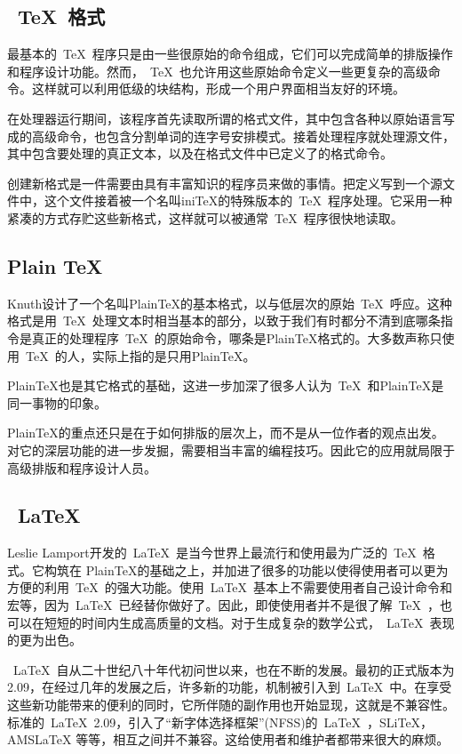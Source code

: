 \subsection{~\TeX{}~格式}
最基本的~\TeX{}~程序只是由一些很原始的命令组成，它们可以完成简单的排版操作和程序设计功能。然而，~\TeX{}~也允许用这些原始命令定义一些更复杂的高级命令。这样就可以利用低级的块结构，形成一个用户界面相当友好的环境。


在处理器运行期间，该程序首先读取所谓的格式文件，其中包含各种以原始语言写成的高级命令，也包含分割单词的连字号安排模式。接着处理程序就处理源文件，其中包含要处理的真正文本，以及在格式文件中已定义了的格式命令。


创建新格式是一件需要由具有丰富知识的程序员来做的事情。把定义写到一个源文件中，这个文件接着被一个名叫iniTeX的特殊版本的~\TeX{}~程序处理。它采用一种紧凑的方式存贮这些新格式，这样就可以被通常~\TeX{}~程序很快地读取。
\subsection{Plain TeX}
Knuth设计了一个名叫PlainTeX的基本格式，以与低层次的原始~\TeX{}~呼应。这种格式是用~\TeX{}~处理文本时相当基本的部分，以致于我们有时都分不清到底哪条指令是真正的处理程序~\TeX{}~的原始命令，哪条是PlainTeX格式的。大多数声称只使用~\TeX{}~的人，实际上指的是只用PlainTeX。


PlainTeX也是其它格式的基础，这进一步加深了很多人认为~\TeX{}~和PlainTeX是同一事物的印象。


PlainTeX的重点还只是在于如何排版的层次上，而不是从一位作者的观点出发。对它的深层功能的进一步发掘，需要相当丰富的编程技巧。因此它的应用就局限于高级排版和程序设计人员。
\subsection{~\LaTeX{}~}
Leslie Lamport开发的~\LaTeX{}~是当今世界上最流行和使用最为广泛的~\TeX{}~格式。它构筑在 PlainTeX的基础之上，并加进了很多的功能以使得使用者可以更为方便的利用~\TeX{}~的强大功能。使用~\LaTeX{}~基本上不需要使用者自己设计命令和宏等，因为~\LaTeX{}~已经替你做好了。因此，即使使用者并不是很了解~\TeX{}~，也可以在短短的时间内生成高质量的文档。对于生成复杂的数学公式，~\LaTeX{}~表现的更为出色。


~\LaTeX{}~自从二十世纪八十年代初问世以来，也在不断的发展。最初的正式版本为 2.09，在经过几年的发展之后，许多新的功能，机制被引入到~\LaTeX{}~中。在享受这些新功能带来的便利的同时，它所伴随的副作用也开始显现，这就是不兼容性。标准的~\LaTeX{}~2.09，引入了“新字体选择框架”(NFSS)的~\LaTeX{}~，SLiTeX，AMSLaTeX 等等，相互之间并不兼容。这给使用者和维护者都带来很大的麻烦。

